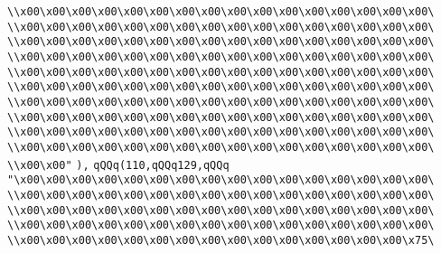 \verb|\\x00\x00\x00\x00\x00\x00\x00\x00\x00\x00\x00\x00\x00\x00\x00\x00\|\newline
\verb|\\x00\x00\x00\x00\x00\x00\x00\x00\x00\x00\x00\x00\x00\x00\x00\x00\|\newline
\verb|\\x00\x00\x00\x00\x00\x00\x00\x00\x00\x00\x00\x00\x00\x00\x00\x00\|\newline
\verb|\\x00\x00\x00\x00\x00\x00\x00\x00\x00\x00\x00\x00\x00\x00\x00\x00\|\newline
\verb|\\x00\x00\x00\x00\x00\x00\x00\x00\x00\x00\x00\x00\x00\x00\x00\x00\|\newline
\verb|\\x00\x00\x00\x00\x00\x00\x00\x00\x00\x00\x00\x00\x00\x00\x00\x00\|\newline
\verb|\\x00\x00\x00\x00\x00\x00\x00\x00\x00\x00\x00\x00\x00\x00\x00\x00\|\newline
\verb|\\x00\x00\x00\x00\x00\x00\x00\x00\x00\x00\x00\x00\x00\x00\x00\x00\|\newline
\verb|\\x00\x00\x00\x00\x00\x00\x00\x00\x00\x00\x00\x00\x00\x00\x00\x00\|\newline
\verb|\\x00\x00\x00\x00\x00\x00\x00\x00\x00\x00\x00\x00\x00\x00\x00\x00\|\newline
\verb|\\x00\x00"|\newline
\verb|),|\newline
\verb|qQQq(110,qQQq129,qQQq|\newline
\verb|"\x00\x00\x00\x00\x00\x00\x00\x00\x00\x00\x00\x00\x00\x00\x00\x00\|\newline
\verb|\\x00\x00\x00\x00\x00\x00\x00\x00\x00\x00\x00\x00\x00\x00\x00\x00\|\newline
\verb|\\x00\x00\x00\x00\x00\x00\x00\x00\x00\x00\x00\x00\x00\x00\x00\x00\|\newline
\verb|\\x00\x00\x00\x00\x00\x00\x00\x00\x00\x00\x00\x00\x00\x00\x00\x00\|\newline
\verb|\\x00\x00\x00\x00\x00\x00\x00\x00\x00\x00\x00\x00\x00\x00\x00\x75\|\newline
